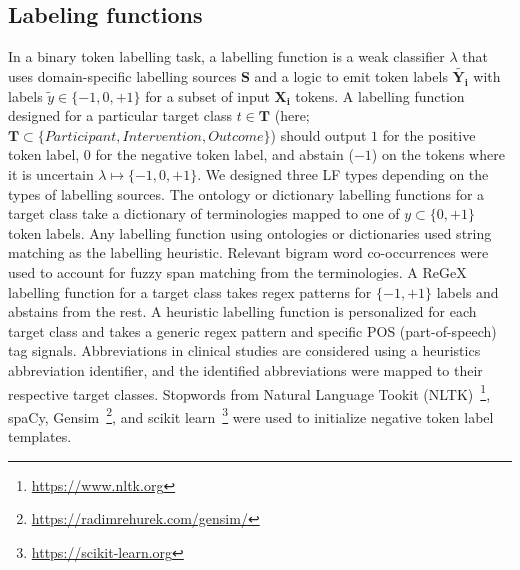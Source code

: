 \documentclass[10.7pt,]{article}
\begin{document}
\subsection{Labeling functions}\label{lfs}
%
In a binary token labelling task, a labelling function is a weak classifier $\lambda$ that uses domain-specific labelling sources $\bm{S}$ and a logic to emit token labels $ \widetilde{\bm{Y_{i}}}$ with labels $ \widetilde{y} \in \{-1, 0, +1\}$ for a subset of input $\bm{X_{i}}$ tokens.
A labelling function designed for a particular target class $t \in \bm{T}$ (here; $\bm{T} \subset \{ Participant, Intervention, Outcome \} $) should output  $1$ for the positive token label, $0$ for the negative token label, and abstain ($-1$) on the tokens where it is uncertain $\lambda \mapsto \{-1, 0, +1\}$.
We designed three LF types depending on the types of labelling sources.
The ontology or dictionary labelling functions for a target class take a dictionary of terminologies mapped to one of $y \subset \{0, +1\} $ token labels.
Any labelling function using ontologies or dictionaries used string matching as the labelling heuristic.
Relevant bigram word co-occurrences were used to account for fuzzy span matching from the terminologies.
A ReGeX labelling function for a target class takes regex patterns for $\{-1, +1\}$ labels and abstains from the rest.
A heuristic labelling function is personalized for each target class and takes a generic regex pattern and specific POS (part-of-speech) tag signals.
Abbreviations in clinical studies are considered using a heuristics abbreviation identifier, and the identified abbreviations were mapped to their respective target classes.
Stopwords from Natural Language Tookit (NLTK)~\footnote{\url{https://www.nltk.org}}, spaCy, Gensim~\footnote{\url{https://radimrehurek.com/gensim/}}, and scikit learn~\footnote{\url{https://scikit-learn.org}} were used to initialize negative token label templates.
%
%
%
\end{document}
